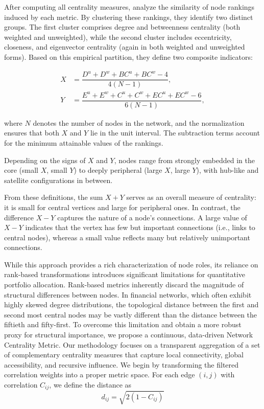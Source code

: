 \documentclass[fleqn]{rbfin}
\begin{document}
After computing all centrality measures, \citealt{pozzi2013spread} analyze the similarity of node rankings induced by each metric. By clustering these rankings, they identify two distinct groups. The first cluster comprises degree and betweenness centrality (both weighted and unweighted), while the second cluster includes eccentricity, closeness, and eigenvector centrality (again in both weighted and unweighted forms). Based on this empirical partition, they define two composite indicators:

\begin{align}
    X &= \dfrac{D^u + D^w + BC^u + BC^w - 4}{4(N-1)}, \\
    Y &= \dfrac{E^u + E^w + C^u + C^w + EC^u + EC^w - 6}{6(N-1)},
\end{align}

\noindent where $N$ denotes the number of nodes in the network, and the normalization ensures that both $X$ and $Y$ lie in the unit interval. The subtraction terms account for the minimum attainable values of the rankings.

Depending on the signs of $X$ and $Y$, nodes range from strongly embedded in the core (small $X$, small $Y$) to deeply peripheral (large $X$, large $Y$), with hub-like and satellite configurations in between.

From these definitions, the sum $X+Y$ serves as an overall measure of centrality: it is small for central vertices and large for peripheral ones. In contrast, the difference $X-Y$ captures the nature of a node’s connections. A large value of $X-Y$ indicates that the vertex has few but important connections (i.e., links to central nodes), whereas a small value reflects many but relatively unimportant connections.

While this approach provides a rich characterization of node roles, its reliance on rank-based transformations introduces significant limitations for quantitative portfolio allocation. Rank-based metrics inherently discard the magnitude of structural differences between nodes. In financial networks, which often exhibit highly skewed degree distributions, the topological distance between the first and second most central nodes may be vastly different than the distance between the fiftieth and fifty-first. To overcome this limitation and obtain a more robust proxy for structural importance, we propose a continuous, data-driven Network Centrality Metric. Our methodology focuses on a transparent aggregation of a set of complementary centrality measures that capture local connectivity, global accessibility, and recursive influence. We begin by transforming the filtered correlation weights into a proper metric space. For each edge $(i,j)$ with correlation $C_{ij}$, we define the distance as
\begin{equation}
    d_{ij} = \sqrt{2(1 - C_{ij})}
\end{equation}
\end{document}

